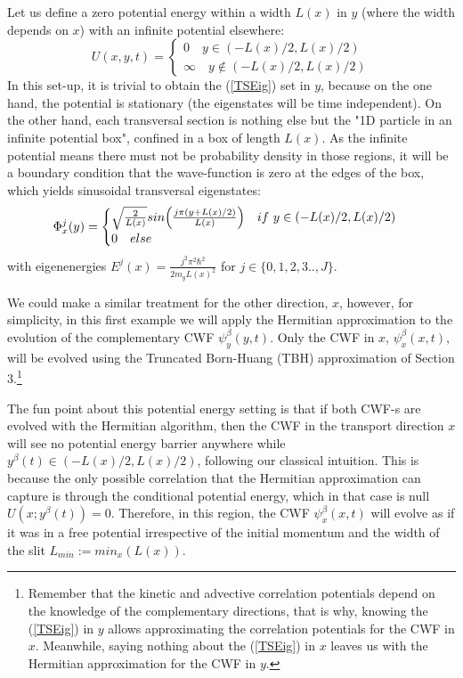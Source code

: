 \documentclass[11pt, a4paper]{article} %
\begin{document}
Let us define a zero potential energy within a width $L(x)$ in $y$ (where the width depends on $x$) with an infinite potential elsewhere:
$$
U(x,y,t)=\begin{cases}
0\quad  y\in (-L(x)/2, L(x)/2)\\
\infty\quad y\notin (-L(x)/2, L(x)/2)
\end{cases}
$$
In this set-up, it is trivial to obtain the (\ref{TSEig}) set in $y$, because on the one hand, the potential is stationary (the eigenstates will be time independent). On the other hand, each transversal section is nothing else but the "1D particle in an infinite potential box", confined in a box of length $L(x)$. As the infinite potential means there must not be probability density in those regions, it will be a boundary condition that the wave-function is zero at the edges of the box, which yields sinusoidal transversal eigenstates:
$$
\Phi^j_{x}(y)=\begin{cases} \sqrt{\frac{2}{L(x)}}sin\qty( \frac{j\pi (y+L(x)/2)}{L(x)} )\quad if\ y\in(-L(x)/2, L(x)/2)\\0\quad else\end{cases}
$$ 
with eigenenergies $E^j(x)=\frac{j^2\pi^2 \hbar^2}{2m_y L(x)^2}$ for $j \in\{0,1,2,3..,J\}$.

We could make a similar treatment for the other direction, $x$, however, for simplicity, in this first example we will apply the Hermitian approximation to the evolution of the complementary CWF $\psi^\beta_y(y,t)$. Only the CWF in $x$, $\psi^\beta_x(x,t)$, will be evolved using the Truncated Born-Huang (TBH) approximation of Section 3.\footnote{Remember that the kinetic and advective correlation potentials depend on the knowledge of the complementary directions, that is why, knowing the (\ref{TSEig}) in $y$ allows approximating the correlation potentials for the CWF in $x$. Meanwhile, saying nothing about the (\ref{TSEig}) in $x$ leaves us with the Hermitian approximation for the CWF in $y$.}

The fun point about this potential energy setting is that if both CWF-s are evolved with the Hermitian algorithm, then the CWF in the transport direction $x$ will see no potential energy barrier anywhere while $y^\beta(t)\in(-L(x)/2,L(x)/2)$, following our classical intuition. This is because the only possible correlation that the Hermitian approximation can capture is through the conditional potential energy, which in that case is null $U(x;y^\beta(t))=0$. Therefore, in this region, the CWF $\psi^\beta_x(x,t)$ will evolve as if it was in a free potential irrespective of the initial momentum and the width of the slit $L_{min}:=min_x(L(x))$.
\end{document}

